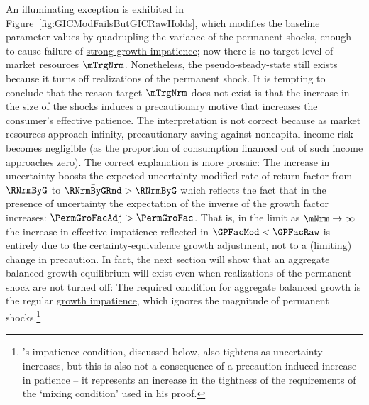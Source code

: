 \documentclass[BufferStockTheory]{subfiles}
\begin{document}
\renewcommand{\figFile}{GICModFailsButGICRawHolds}
\hypertarget{\figFile}{}


An illuminating exception is exhibited in Figure~\ref{fig:GICModFailsButGICRawHolds}, which modifies the baseline parameter values by quadrupling the variance of the permanent shocks, enough to cause failure of \hyperlink{GICMod}{strong growth impatience}; now there is no target level of market resources $\mTrgNrm$.
Nonetheless, the pseudo-steady-state still exists because it turns off realizations of the permanent shock.
It is tempting to conclude that the reason target $\mTrgNrm$ does not exist is that the increase in the size of the shocks induces a precautionary motive that increases the consumer's effective patience.
The interpretation is not correct because as market resources approach infinity, precautionary saving against noncapital income risk becomes negligible (as the proportion of consumption financed out of such income approaches zero).
The correct explanation is more prosaic: The increase in uncertainty boosts the expected uncertainty-modified rate of return factor from $\RNrmByG$ to $\bar{\RNrmByGRnd}>\RNrmByG$ which reflects the fact that in the presence of uncertainty the expectation of the inverse of the growth factor increases: $\PermGroFacAdj > \PermGroFac$.
That is, in the limit as $\mNrm \rightarrow \infty$ the increase in effective impatience reflected in $\GPFacMod < \GPFacRaw$ is entirely due to the certainty-equivalence growth adjustment, not to a (limiting) change in precaution.
In fact, the next section will show that an aggregate balanced growth equilibrium will exist even when realizations of the permanent shock are not turned off: The required condition for aggregate balanced growth is the regular \hyperlink{GIC}{growth impatience}, which ignores the magnitude of permanent shocks.\footnote{\cite{szeidlInvariant}'s impatience condition, discussed below, also tightens as uncertainty increases, but this is also not a consequence of a precaution-induced increase in patience -- it represents an increase in the tightness of the requirements of the `mixing condition' used in his proof.}

\begin{comment}
again, removed FHWC above since GIC holds.
double check.

\end{comment}
\end{document}
